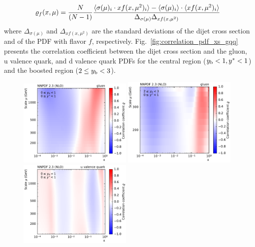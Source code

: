 \begin{equation}
  \varrho_f (x,\mu) =
  \frac{N}{(N-1)} \frac{%
    \langle \sigma(\mu)_i \cdot xf(x,\mu^2)_i \rangle -
    \langle \sigma(\mu)_i \rangle \cdot
    \langle xf(x,\mu^2)_i \rangle}
  {\Delta_{\sigma(\mu)} \Delta_{xf(x,\mu^2)}}
\end{equation}
%
where $\Delta_{\sigma(\mu)}$ and $\Delta_{xf(x,\mu^2)}$ are the standard deviations of the
dijet cross section and of the PDF with flavor $f$, respectively.
Fig.~\ref{fig:correlation_pdf_xs_gqq} presents the correlation coefficient
between the dijet cross section and the gluon, u valence quark, and d valence
quark PDFs for the central region ($y_{\mathrm{b}} < 1, y^{*} < 1$) and the
boosted region ($2 \leq y_{\mathrm{b}} < 3$).

\begin{figure}[p]
  \centering
  \includegraphics[width=0.49\textwidth]{figures/pdf_constraints/corr_PTMAXEXPYS_YBYS_NLO_FINALBINS_NNPDF23_gluon_ys0_0yb0_0_cl.pdf}\hfill%
  \includegraphics[width=0.49\textwidth]{figures/pdf_constraints/corr_PTMAXEXPYS_YBYS_NLO_FINALBINS_NNPDF23_gluon_ys0_0yb2_0_cl.pdf}
  \includegraphics[width=0.49\textwidth]{figures/pdf_constraints/corr_PTMAXEXPYS_YBYS_NLO_FINALBINS_NNPDF23_u_valence_quark_ys0_0yb0_0_cl.pdf}\hfill%

\end{figure}
